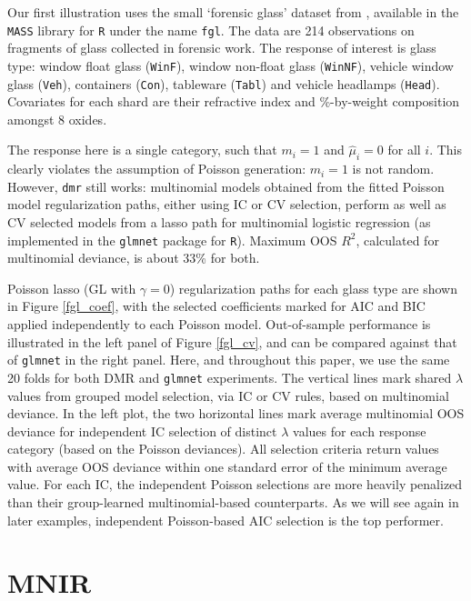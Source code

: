 \documentclass[12pt]{article}
\newcommand{\cd}[1]{{\tt#1}}
\begin{document}
Our first illustration uses the small `forensic glass' dataset from
\citet{venables_modern_2002}, available in the \cd{MASS} library for \cd{R}
under the name \cd{fgl}.  The data are 214 observations on fragments of glass
collected in forensic work. The response of interest is glass type: window
float glass (\cd{WinF}), window non-float glass (\cd{WinNF}), vehicle window
glass (\cd{Veh}), containers (\cd{Con}), tableware (\cd{Tabl}) and vehicle
headlamps (\cd{Head}).  Covariates for each shard are their refractive index
and \%-by-weight composition amongst 8 oxides.

The response here is a single category, such that $m_i = 1$ and $\hat\mu_i=0$
for all $i$.  This clearly violates the assumption of Poisson generation:
$m_i=1$ is not random.  However, \cd{dmr} still works:  multinomial models
obtained from the fitted Poisson model regularization paths, either using IC
or CV selection, perform as well as CV selected models from a lasso path for
multinomial logistic regression (as implemented in the \cd{glmnet} package for
\cd{R}).  Maximum OOS $R^2$, calculated for multinomial deviance, is about
33\% for both.

Poisson lasso (GL with $\gamma=0$) regularization paths for each glass type
are shown in Figure \ref{fgl_coef}, with the selected coefficients marked for
AIC and BIC applied independently to each Poisson model.  Out-of-sample
performance is illustrated in the left panel of Figure \ref{fgl_cv}, and can
be compared against that of \cd{glmnet} in the right panel.  Here, and
throughout this paper, we use the same 20 folds for both DMR and \cd{glmnet}
experiments.  The vertical lines mark shared $\lambda$ values from grouped
model selection, via IC or CV rules, based on multinomial deviance.  In the
left plot, the two horizontal lines mark average multinomial OOS deviance for
independent IC selection of distinct $\lambda$ values for each response
category (based on the Poisson deviances).  All selection criteria return
values with average OOS deviance within one standard error of the minimum
average value.  For each IC, the independent Poisson selections are more
heavily penalized than their group-learned multinomial-based counterparts.  As
we will see again in later examples, independent Poisson-based AIC selection
is the top performer.

\section{MNIR}
\label{MNIR}
\end{document}
